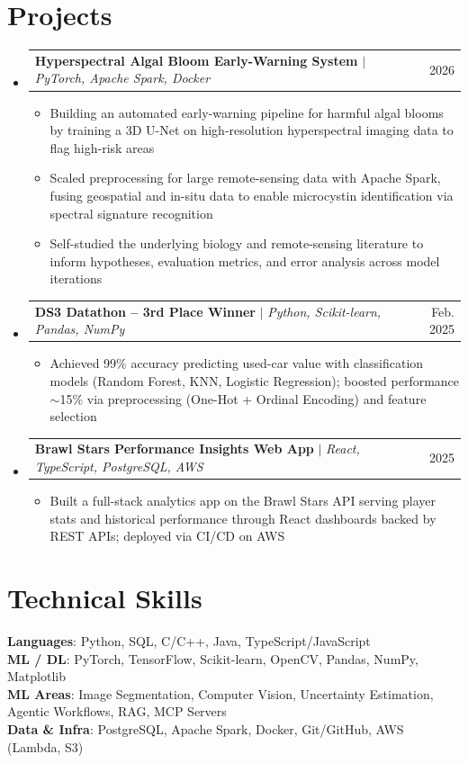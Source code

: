 \documentclass[letterpaper,10pt]{article}
\makeatletter
\newcommand{\resumeItem}[1]{
  \item\small{
    {#1 \vspace{-2pt}}
  }
}
\newcommand{\resumeProjectHeading}[2]{
    \item
    \begin{tabular*}{0.97\textwidth}{l@{\extracolsep{\fill}}r}
      \small#1 & #2 \\
    \end{tabular*}\vspace{-7pt}
}
\newcommand{\resumeSubHeadingListStart}{\begin{itemize}[leftmargin=0.15in, label={}]}
\newcommand{\resumeSubHeadingListEnd}{\end{itemize}}
\newcommand{\resumeItemListStart}{\begin{itemize}}
\newcommand{\resumeItemListEnd}{\end{itemize}\vspace{-5pt}}
\makeatother
\begin{document}
\section{Projects}
    \resumeSubHeadingListStart
      \resumeProjectHeading
          {\textbf{Hyperspectral Algal Bloom Early-Warning System} $|$ \emph{PyTorch, Apache Spark, Docker}}{2026}
          \resumeItemListStart
            \resumeItem{Building an automated early-warning pipeline for harmful algal blooms by training a 3D U-Net on high-resolution hyperspectral imaging data to flag high-risk areas}
            \resumeItem{Scaled preprocessing for large remote-sensing data with Apache Spark, fusing geospatial and in-situ data to enable microcystin identification via spectral signature recognition}
            \resumeItem{Self-studied the underlying biology and remote-sensing literature to inform hypotheses, evaluation metrics, and error analysis across model iterations}
          \resumeItemListEnd
      \resumeProjectHeading
          {\textbf{DS3 Datathon -- 3rd Place Winner} $|$ \emph{Python, Scikit-learn, Pandas, NumPy}}{Feb. 2025}
          \resumeItemListStart
            \resumeItem{Achieved 99\% accuracy predicting used-car value with classification models (Random Forest, KNN, Logistic Regression); boosted performance $\sim$15\% via preprocessing (One-Hot + Ordinal Encoding) and feature selection}
          \resumeItemListEnd
      \resumeProjectHeading
          {\textbf{Brawl Stars Performance Insights Web App} $|$ \emph{React, TypeScript, PostgreSQL, AWS}}{2025}
          \resumeItemListStart
            \resumeItem{Built a full-stack analytics app on the Brawl Stars API serving player stats and historical performance through React dashboards backed by REST APIs; deployed via CI/CD on AWS}
          \resumeItemListEnd
    \resumeSubHeadingListEnd


\section{Technical Skills}
 \begin{itemize}[leftmargin=0.15in, label={}]
    \small{\item{
     \textbf{Languages}{: Python, SQL, C/C++, Java, TypeScript/JavaScript} \\
     \textbf{ML / DL}{: PyTorch, TensorFlow, Scikit-learn, OpenCV, Pandas, NumPy, Matplotlib} \\
     \textbf{ML Areas}{: Image Segmentation, Computer Vision, Uncertainty Estimation, Agentic Workflows, RAG, MCP Servers} \\
     \textbf{Data \& Infra}{: PostgreSQL, Apache Spark, Docker, Git/GitHub, AWS (Lambda, S3)}
    }}
 \end{itemize}


\end{document}
